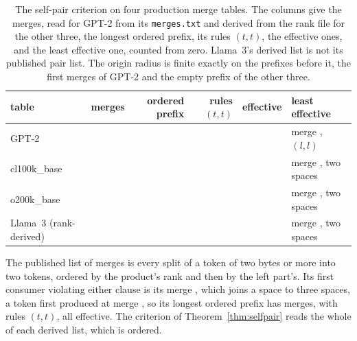 \documentclass[11pt,a4paper]{article}
\theoremstyle{definition}
\theoremstyle{plain}
\newcommand{\code}[1]{\texttt{#1}}
\begin{document}
\begin{table}[t]
\centering
\setlength{\tabcolsep}{5pt}
\begin{tabular}{@{}lrrrrl@{}}
\toprule
table & merges & ordered prefix & rules \((t, t)\) & effective & least effective \\
\midrule
GPT-2 & \GptRules{} & \GptRules{} & \GptSelfPairs{} & \GptEffective{} & merge \GptFinitePrefix{}, \((l, l)\) \\
cl100k\_base & \ClMerges{} & \ClAdmissible{} & \ClSelfPairs{} & \ClEffective{} & merge \ClLeastMerge{}, two spaces \\
o200k\_base & \OMerges{} & \OAdmissible{} & \OSelfPairs{} & \OEffective{} & merge \OLeastMerge{}, two spaces \\
Llama~3 (rank-derived) & \LlamaMerges{} & \LlamaAdmissible{} & \LlamaSelfPairs{} & \LlamaEffective{} & merge
\LlamaLeastMerge{}, two spaces \\
\bottomrule
\end{tabular}
\caption{The self-pair criterion on four production merge tables. The columns give the merges, read for GPT-2 from
its \code{merges.txt} and derived from the rank file for the other three, the longest ordered prefix, its rules
\((t, t)\), the effective ones, and the least effective one, counted from zero. Llama~3's derived list is not its
published pair list. The origin radius is finite exactly on the prefixes before it, the first \GptFinitePrefix{} merges
of GPT-2 and the empty prefix of the other three.}
\label{tab:vocabs}
\end{table}

The published list of \LlamaPublishedMerges{} merges is every split of a token of two bytes or more into two tokens,
ordered by the product's rank and then by the left part's. Its first consumer violating either clause is its merge
\LlamaPublishedFail{}, which joins a space to three spaces, a token first produced at merge \LlamaPublishedOrdered{}, so
its longest ordered prefix has \LlamaPublishedOrdered{} merges, with \LlamaPublishedSelfPairs{} rules \((t, t)\), all
effective. The criterion of Theorem~\ref{thm:selfpair} reads the whole of each derived list, which is ordered.
\end{document}
